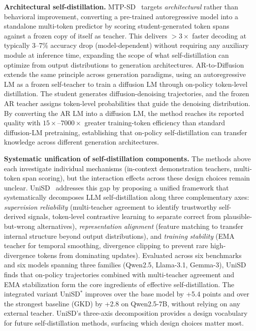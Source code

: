 \documentclass{article} %
\begin{document}
\textbf{Architectural self-distillation.} MTP-SD~\citep{2602.06019} targets \emph{architectural} rather than behavioral improvement, converting a pre-trained autoregressive model into a standalone multi-token predictor by scoring student-generated token spans against a frozen copy of itself as teacher. This delivers $>3\times$ faster decoding at typically 3--7\% accuracy drop (model-dependent) without requiring any auxiliary module at inference time, expanding the scope of what self-distillation can optimize from output distributions to generation architectures. AR-to-Diffusion~\citep{2606.06712} extends the same principle across generation paradigms, using an autoregressive LM as a frozen self-teacher to train a diffusion LM through on-policy token-level distillation. The student generates diffusion-denoising trajectories, and the frozen AR teacher assigns token-level probabilities that guide the denoising distribution. By converting the AR LM into a diffusion LM, the method reaches its reported quality with $15\times$--$7000\times$ greater training-token efficiency than standard diffusion-LM pretraining, establishing that on-policy self-distillation can transfer knowledge across different generation architectures.

\textbf{Systematic unification of self-distillation components.} The methods above each investigate individual mechanisms (in-context demonstration teachers, multi-token span scoring), but the interaction effects across these design choices remain unclear. UniSD~\citep{2605.06597} addresses this gap by proposing a unified framework that systematically decomposes LLM self-distillation along three complementary axes: \emph{supervision reliability} (multi-teacher agreement to identify trustworthy self-derived signals, token-level contrastive learning to separate correct from plausible-but-wrong alternatives), \emph{representation alignment} (feature matching to transfer internal structure beyond output distributions), and \emph{training stability} (EMA teacher for temporal smoothing, divergence clipping to prevent rare high-divergence tokens from dominating updates). Evaluated across six benchmarks and six models spanning three families (Qwen2.5, Llama-3.1, Gemma-3), UniSD finds that on-policy trajectories combined with multi-teacher agreement and EMA stabilization form the core ingredients of effective self-distillation. The integrated variant UniSD$^*$ improves over the base model by +5.4 points and over the strongest baseline (GKD) by +2.8 on Qwen2.5-7B, without relying on any external teacher. UniSD's three-axis decomposition provides a design vocabulary for future self-distillation methods, surfacing which design choices matter most.
\end{document}
